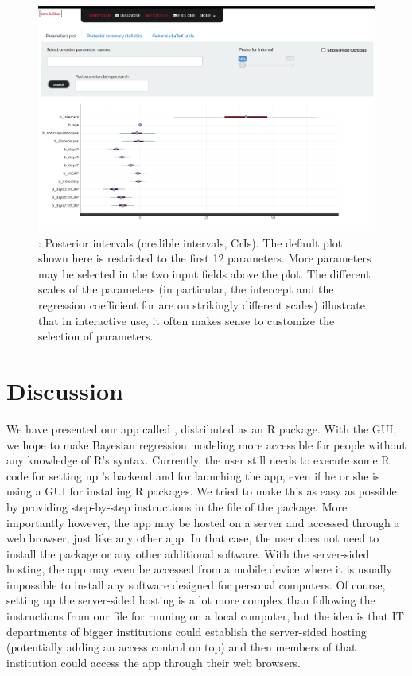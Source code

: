 \begin{figure}[t!]
  \centering
  \includegraphics[width=\textwidth]{Figures/shinystan_intervals.png}
  \caption[: CrIs]{: Posterior intervals (credible
  intervals, CrIs). The default plot shown here is restricted to the first 12
  parameters. More parameters may be selected in the two input fields above the
  plot.
  The different scales of the parameters (in particular, the intercept and the
  regression coefficient for  are on strikingly different scales)
  illustrate that in interactive use, it often makes sense to customize the
  selection of parameters.}
  \label{fig:shinystan-intvls}
\end{figure}%

\section{Discussion}
\label{disc}

We have presented our  app called , distributed as
an R package. With the  GUI, we hope to make Bayesian
regression modeling more accessible for people without any knowledge of
R's syntax. Currently, the user still needs to execute some R code
for setting up 's backend and for launching the 
app, even if he or she is using a GUI for installing R packages. We tried
to make this as easy as possible by providing step-by-step instructions in the
 file of the  package. More importantly
however, the  app may be hosted on a server and accessed through a
web browser, just like any other  app. In that case, the user does
not need to install the  package or any other additional
software. With the server-sided hosting, the  app may even be
accessed from a mobile device where it is usually impossible to install any
software designed for personal computers. Of course, setting up the
server-sided hosting is a lot more complex than following the instructions
from our  file for running  on a local
computer, but the idea is that IT departments of bigger institutions
could establish the server-sided hosting (potentially adding an access
control on top) and then members of that institution could access the
 app through their web browsers.

